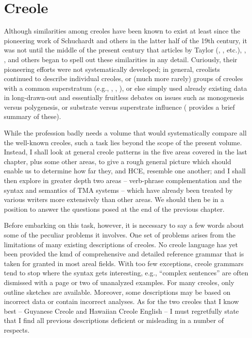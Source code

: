 \chapter{Creole} \label{ch:2}

Although similarities among creoles have been known to exist at least since the pioneering work of Schuchardt and others in the latter half of the 19th century, it was not until the middle of the present century that articles by Taylor (\citeyear{Taylor1960}, \citeyear{Taylor1963}, etc.), \citet{Thompson1961}, \citet{Whinnom1956, Whinnom1965}, and others began to spell out these similarities in any detail. Curiously, their pioneering efforts were not systematically developed; in general, creolists continued to describe individual creoles, or (much more rarely) groups of creoles with a common superstratum (e.g., \citealt{Goodman1964}, \citealt{Hancock1970}, \citealt{Alleyne1980}), or else simply used already existing data in long-drawn-out and essentially fruitless debates on issues such as monogenesis versus poly\-genesis, or substrate versus superstrate influence (\citealt{Bickerton1976} provides a brief summary of these).

While the profession badly needs a volume that would systematically compare all the well-known creoles, such a task lies beyond the scope of the present volume. Instead, I shall look at general creole patterns in the five areas covered in the last chapter, plus some other areas, to give a rough general picture which should enable us to deter\-mine how far they, and HCE, resemble one another; and I shall then
explore in greater depth two areas -- verb-phrase complementation and the syntax and semantics of TMA systems -- which have already been treated by various writers more extensively than other areas. We should then be in a position to answer the questions posed at the end of the previous chapter. 

Before embarking on this task, however, it is necessary to say a few words about some of the peculiar problems it involves. One set of problems arises from the limitations of many existing descriptions of creoles. No creole language has yet been provided the kmd of com\-prehensive and detailed reference grammar that is taken for granted in most areal fields. With too few exceptions, creole grammars tend to stop where the syntax gets interesting, e.g., ``complex sentences'' are often dismissed with a page or two of unanalyzed examples. For many creoles, only outline sketches are available. Moreover, some descriptions may be based on incorrect data or contain incorrect analyses. As for the two creoles that I know best -- Guyanese Creole and Hawaiian Creole English -- I must regretfully state that I find all previous descriptions deficient or misleading in a number of respects.

